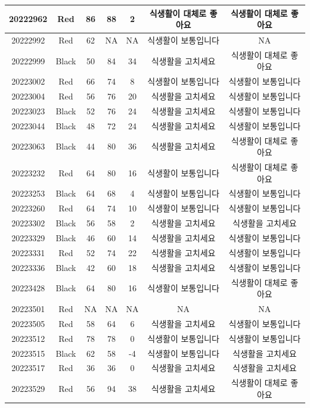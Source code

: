 \documentclass[
]{book}
\begin{document}
\begin{tabular}{c|c|c|c|c|c|c}
\hline
20222962 & Red & 86 & 88 & 2 & 식생활이 대체로 좋아요 & 식생활이 대체로 좋아요\\
\hline
20222992 & Red & 62 & NA & NA & 식생활이 보통입니다 & NA\\
\hline
20222999 & Black & 50 & 84 & 34 & 식생활을 고치세요 & 식생활이 대체로 좋아요\\
\hline
20223002 & Red & 66 & 74 & 8 & 식생활이 보통입니다 & 식생활이 보통입니다\\
\hline
20223004 & Red & 56 & 76 & 20 & 식생활을 고치세요 & 식생활이 보통입니다\\
\hline
20223023 & Black & 52 & 76 & 24 & 식생활을 고치세요 & 식생활이 보통입니다\\
\hline
20223044 & Black & 48 & 72 & 24 & 식생활을 고치세요 & 식생활이 보통입니다\\
\hline
20223063 & Black & 44 & 80 & 36 & 식생활을 고치세요 & 식생활이 대체로 좋아요\\
\hline
20223232 & Red & 64 & 80 & 16 & 식생활이 보통입니다 & 식생활이 대체로 좋아요\\
\hline
20223253 & Black & 64 & 68 & 4 & 식생활이 보통입니다 & 식생활이 보통입니다\\
\hline
20223260 & Red & 64 & 74 & 10 & 식생활이 보통입니다 & 식생활이 보통입니다\\
\hline
20223302 & Black & 56 & 58 & 2 & 식생활을 고치세요 & 식생활을 고치세요\\
\hline
20223329 & Black & 46 & 60 & 14 & 식생활을 고치세요 & 식생활이 보통입니다\\
\hline
20223331 & Red & 52 & 74 & 22 & 식생활을 고치세요 & 식생활이 보통입니다\\
\hline
20223336 & Black & 42 & 60 & 18 & 식생활을 고치세요 & 식생활이 보통입니다\\
\hline
20223428 & Black & 64 & 80 & 16 & 식생활이 보통입니다 & 식생활이 대체로 좋아요\\
\hline
20223501 & Red & NA & NA & NA & NA & NA\\
\hline
20223505 & Red & 58 & 64 & 6 & 식생활을 고치세요 & 식생활이 보통입니다\\
\hline
20223512 & Red & 78 & 78 & 0 & 식생활이 보통입니다 & 식생활이 보통입니다\\
\hline
20223515 & Black & 62 & 58 & -4 & 식생활이 보통입니다 & 식생활을 고치세요\\
\hline
20223517 & Red & 36 & 36 & 0 & 식생활을 고치세요 & 식생활을 고치세요\\
\hline
20223529 & Red & 56 & 94 & 38 & 식생활을 고치세요 & 식생활이 대체로 좋아요\\

\end{tabular}
\end{document}
